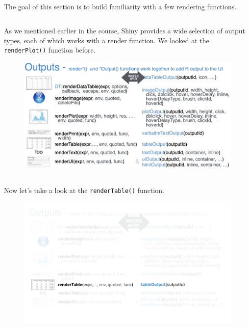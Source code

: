 \documentclass[
  letterpaper,
  DIV=11,
  numbers=noendperiod]{scrreprt}
\begin{document}
The goal of this section is to build familiarity with a few rendering
functions.

\hypertarget{section-20}{%
\subsection{}\label{section-20}}

As we mentioned earlier in the course, Shiny provides a wide selection
of output types, each of which works with a render function. We looked
at the \texttt{renderPlot()} function before.

\begin{figure}

{\centering \includegraphics[width=1\textwidth,height=\textheight]{./images/cheatsheet-outputs.png}

}

\end{figure}

\hypertarget{section-21}{%
\subsection{}\label{section-21}}

Now let's take a look at the \texttt{renderTable()} function.

\begin{figure}

{\centering \includegraphics[width=1\textwidth,height=\textheight]{./images/cheatsheet-renderTable.png}

}

\end{figure}
\end{document}
